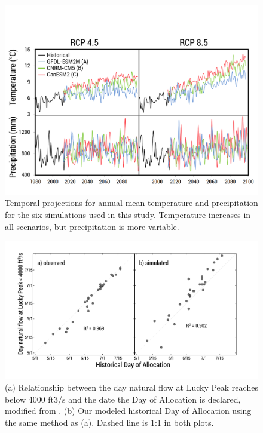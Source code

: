 \documentclass[water,article,submit,moreauthors,pdftex,10pt,a4paper]{mdpi}
\theoremstyle{mdpi}
\newcounter{ex}
\newcounter{re}
\theoremstyle{mdpidefinition}
\begin{document}
\begin{figure}
\centering
\includegraphics[width=\textwidth]{figure-files/figure5.png}
\caption{Temporal projections for annual mean temperature and precipitation for the six simulations used in this study. Temperature increases in all scenarios, but precipitation is more variable.}
\label{fig:ClimateChangeSelected}
\end{figure}
\clearpage

\begin{figure}
\centering
\includegraphics[width=\textwidth]{figure-files/figure6.png}
\caption{(a) Relationship between the day natural flow at Lucky Peak reaches below 4000 ft3/s and the date the Day of Allocation is declared, modified from \citep{Garst:2017bg}.  (b) Our modeled historical Day of Allocation using the same method as (a). Dashed line is 1:1 in both plots.}
\label{fig:DayOfAllocation}
\end{figure}
\clearpage
\end{document}
